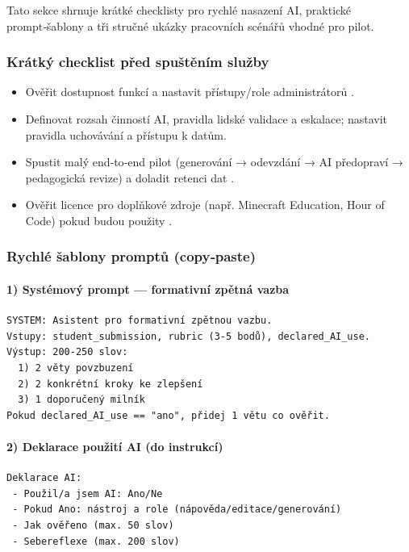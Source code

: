 \documentclass{report}%
\begin{document}
%
Tato sekce shrnuje krátké checklisty pro rychlé nasazení AI, praktické prompt‑šablony a tři stručné ukázky pracovních scénářů vhodné pro pilot.

\subsubsection*{Krátký checklist před spuštěním služby}
\begin{itemize}
  \item Ověřit dostupnost funkcí a nastavit přístupy/role administrátorů \cite{kb_ai_101_tipu_pdf_04e4a115_page_8_1}.
  \item Definovat rozsah činností AI, pravidla lidské validace a eskalace; nastavit pravidla uchovávání a přístupu k datům.
  \item Spustit malý end‑to‑end pilot (generování → odevzdání → AI předopraví → pedagogická revize) a doladit retenci dat \cite{kb_ai_101_tipu_pdf_04e4a115_page_8_1}.
  \item Ověřit licence pro doplňkové zdroje (např. Minecraft Education, Hour of Code) pokud budou použity \cite{kb_ai_101_tipu_pdf_04e4a115_page_15_2}.
\end{itemize}

\subsubsection*{Rychlé šablony promptů (copy‑paste)}
\paragraph{1) Systémový prompt — formativní zpětná vazba}
\begin{verbatim}
SYSTEM: Asistent pro formativní zpětnou vazbu.
Vstupy: student_submission, rubric (3-5 bodů), declared_AI_use.
Výstup: 200-250 slov:
  1) 2 věty povzbuzení
  2) 2 konkrétní kroky ke zlepšení
  3) 1 doporučený milník
Pokud declared_AI_use == "ano", přidej 1 větu co ověřit.
\end{verbatim}

\paragraph{2) Deklarace použití AI (do instrukcí)}
\begin{verbatim}
Deklarace AI:
 - Použil/a jsem AI: Ano/Ne
 - Pokud Ano: nástroj a role (nápověda/editace/generování)
 - Jak ověřeno (max. 50 slov)
 - Sebereflexe (max. 200 slov)
\end{verbatim}
\end{document}
